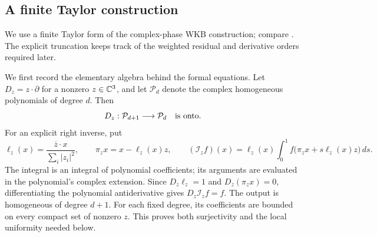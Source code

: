 \subsection{A finite Taylor construction}

We use a finite Taylor form of the complex-phase WKB construction;
compare \cite[Section~3]{DenckerSjostrandZworski2004}.
The explicit truncation keeps track of the weighted residual and
derivative orders required later.

We first record the elementary algebra behind the formal equations.
Let $D_z=z\cdot\partial$ for a nonzero $z\in\mathbb C^3$, and let
$\mathcal P_d$ denote the complex homogeneous polynomials of degree $d$.
Then
\begin{equation}
 D_z:\mathcal P_{d+1}\longrightarrow\mathcal P_d
 \quad\hbox{is onto}.
 \label{eq:polynomial-surjectivity}
\end{equation}
For an explicit right inverse, put
\[
 \ell_z(x)=\frac{\overline z\cdot x}{\sum_i|z_i|^2},
 \qquad \pi_zx=x-\ell_z(x)z,
 \qquad
 (\mathcal I_z f)(x)=\ell_z(x)
      \int_0^1 f\bigl(\pi_zx+s\ell_z(x)z\bigr)\,ds.
\]
The integral is an integral of polynomial coefficients; its arguments
are evaluated in the polynomial's complex extension.
Since $D_z\ell_z=1$ and $D_z(\pi_zx)=0$, differentiating the polynomial
antiderivative gives $D_z\mathcal I_z f=f$.  The output is homogeneous
of degree $d+1$.  For each fixed degree, its coefficients are bounded
on every compact set of nonzero $z$.  This proves both surjectivity and
the local uniformity needed below.

